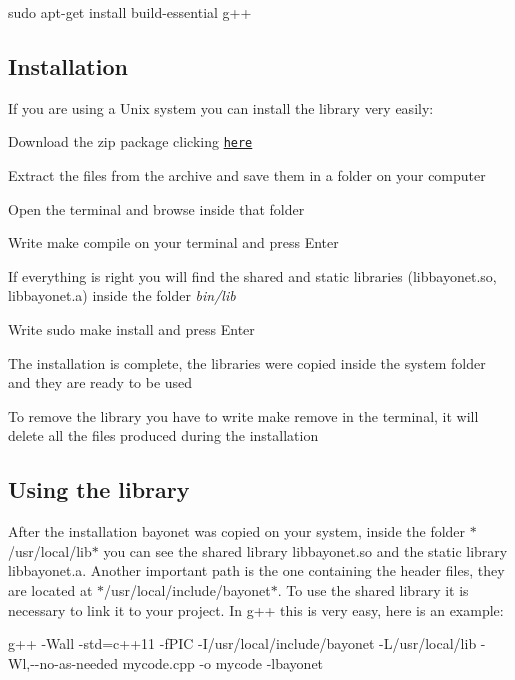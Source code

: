 {\ttfamily sudo apt-\/get install build-\/essential g++}

\subsection*{Installation }

If you are using a Unix system you can install the library very easily\-:


\begin{DoxyEnumerate}
\item Download the zip package clicking \href{https://github.com/mpatacchiola/bayonet/archive/master.zip}{\tt here}
\item Extract the files from the archive and save them in a folder on your computer
\item Open the terminal and browse inside that folder
\item Write {\ttfamily make compile} on your terminal and press Enter
\item If everything is right you will find the shared and static libraries (libbayonet.\-so, libbayonet.\-a) inside the folder {\itshape bin/lib}
\item Write {\ttfamily sudo make install} and press Enter
\item The installation is complete, the libraries were copied inside the system folder and they are ready to be used
\item To remove the library you have to write {\ttfamily make remove} in the terminal, it will delete all the files produced during the installation
\end{DoxyEnumerate}

\subsection*{Using the library }

After the installation bayonet was copied on your system, inside the folder $\ast$/usr/local/lib$\ast$ you can see the shared library libbayonet.\-so and the static library libbayonet.\-a. Another important path is the one containing the header files, they are located at $\ast$/usr/local/include/bayonet$\ast$. To use the shared library it is necessary to link it to your project. In g++ this is very easy, here is an example\-:

{\ttfamily g++ -\/\-Wall -\/std=c++11 -\/f\-P\-I\-C -\/\-I/usr/local/include/bayonet -\/\-L/usr/local/lib -\/\-Wl,-\/-\/no-\/as-\/needed mycode.\-cpp -\/o mycode -\/lbayonet}

